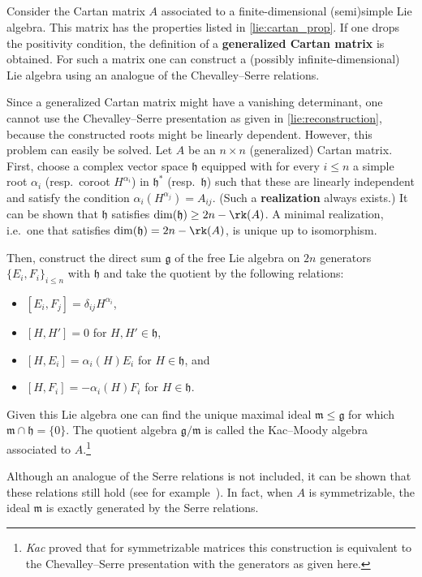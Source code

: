 \subsection{}

    \begin{construct}\label{lie:kac_moody}
        Consider the Cartan matrix $A$ associated to a finite-dimensional (semi)simple Lie algebra. This matrix has the properties listed in \ref{lie:cartan_prop}. If one drops the positivity condition, the definition of a \textbf{generalized Cartan matrix} is obtained. For such a matrix one can construct a (possibly infinite-dimensional) Lie algebra using an analogue of the Chevalley--Serre relations.

        Since a generalized Cartan matrix might have a vanishing determinant, one cannot use the Chevalley--Serre presentation as given in \cref{lie:reconstruction}, because the constructed roots might be linearly dependent. However, this problem can easily be solved. Let $A$ be an $n\times n$ (generalized) Cartan matrix. First, choose a complex vector space $\mathfrak{h}$ equipped with for every $i\leq n$ a simple root $\alpha_i$ (resp.~coroot $H^{\alpha_i}$) in $\mathfrak{h}^*$ (resp.~$\mathfrak{h}$) such that these are linearly independent and satisfy the condition $\alpha_i(H^{\alpha_j})=A_{ij}$. (Such a \textbf{realization} always exists.) It can be shown that $\mathfrak{h}$ satisfies $\dim(\mathfrak{h})\geq2n-\rk(A)$. A minimal realization, i.e.~one that satisfies $\dim(\mathfrak{h})=2n-\rk(A)$, is unique up to isomorphism.

        Then, construct the direct sum $\mathfrak{g}$ of the free Lie algebra on $2n$ generators $\{E_i,F_i\}_{i\leq n}$ with $\mathfrak{h}$ and take the quotient by the following relations:
        \begin{itemize}
            \item $[E_i,F_j] = \delta_{ij}H^{\alpha_i}$,
            \item $[H,H']=0$ for $H,H'\in\mathfrak{h}$,
            \item $[H,E_i]=\alpha_i(H)E_i$ for $H\in\mathfrak{h}$, and
            \item $[H,F_i]=-\alpha_i(H)F_i$ for $H\in\mathfrak{h}$.
        \end{itemize}
        Given this Lie algebra one can find the unique maximal ideal $\mathfrak{m}\leq\mathfrak{g}$ for which $\mathfrak{m}\cap\mathfrak{h}=\{0\}$. The quotient algebra $\mathfrak{g}/\mathfrak{m}$ is called the Kac--Moody algebra associated to $A$.\footnote{\textit{Kac} proved that for symmetrizable matrices this construction is equivalent to the Chevalley--Serre presentation with the generators as given here.}

        Although an analogue of the Serre relations is not included, it can be shown that these relations still hold (see for example~\citet{amini_infinite-dimensional_2014}). In fact, when $A$ is symmetrizable, the ideal $\mathfrak{m}$ is exactly generated by the Serre relations.
    \end{construct}
